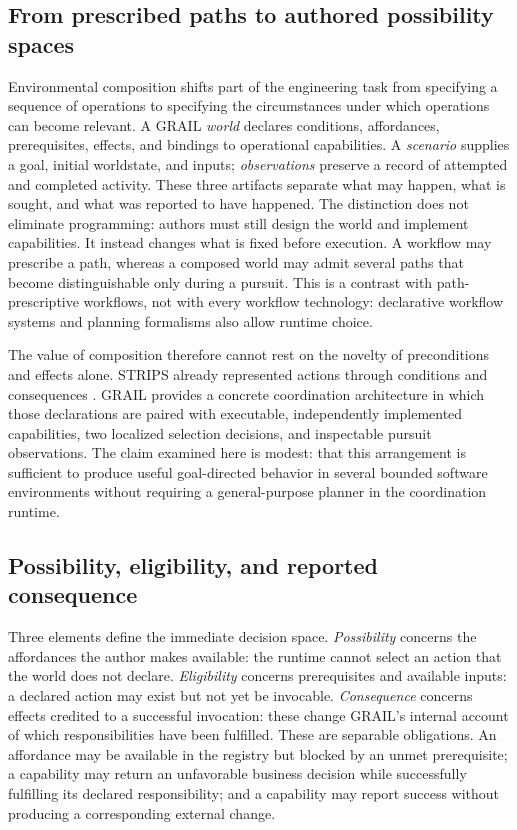 \documentclass[11pt]{article}
\begin{document}
\subsection{From prescribed paths to authored possibility spaces}
Environmental composition shifts part of the engineering task from specifying a sequence of operations to specifying the circumstances under which operations can become relevant. A GRAIL \emph{world} declares conditions, affordances, prerequisites, effects, and bindings to operational capabilities. A \emph{scenario} supplies a goal, initial worldstate, and inputs; \emph{observations} preserve a record of attempted and completed activity. These three artifacts separate what may happen, what is sought, and what was reported to have happened. The distinction does not eliminate programming: authors must still design the world and implement capabilities. It instead changes what is fixed before execution. A workflow may prescribe a path, whereas a composed world may admit several paths that become distinguishable only during a pursuit. This is a contrast with path-prescriptive workflows, not with every workflow technology: declarative workflow systems and planning formalisms also allow runtime choice.

The value of composition therefore cannot rest on the novelty of preconditions and effects alone. STRIPS already represented actions through conditions and consequences \cite{FikesNilsson1971}. GRAIL provides a concrete coordination architecture in which those declarations are paired with executable, independently implemented capabilities, two localized selection decisions, and inspectable pursuit observations. The claim examined here is modest: that this arrangement is sufficient to produce useful goal-directed behavior in several bounded software environments without requiring a general-purpose planner in the coordination runtime.

\subsection{Possibility, eligibility, and reported consequence}
Three elements define the immediate decision space. \emph{Possibility} concerns the affordances the author makes available: the runtime cannot select an action that the world does not declare. \emph{Eligibility} concerns prerequisites and available inputs: a declared action may exist but not yet be invocable. \emph{Consequence} concerns effects credited to a successful invocation: these change GRAIL's internal account of which responsibilities have been fulfilled. These are separable obligations. An affordance may be available in the registry but blocked by an unmet prerequisite; a capability may return an unfavorable business decision while successfully fulfilling its declared responsibility; and a capability may report success without producing a corresponding external change.
\end{document}
